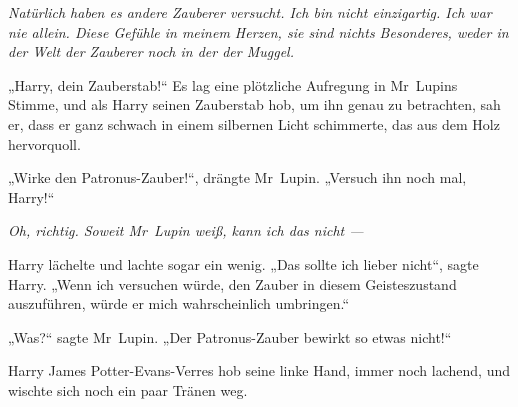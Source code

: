 \emph{Natürlich haben es andere Zauberer versucht. Ich bin nicht einzigartig. Ich war nie allein. Diese Gefühle in meinem Herzen, sie sind nichts Besonderes, weder in der Welt der Zauberer noch in der der Muggel.}

„Harry, dein Zauberstab!“ Es lag eine plötzliche Aufregung in Mr~Lupins Stimme, und als Harry seinen Zauberstab hob, um ihn genau zu betrachten, sah er, dass er ganz schwach in einem silbernen Licht schimmerte, das aus dem Holz hervorquoll.

„Wirke den Patronus-Zauber!“, drängte Mr~Lupin.
„Versuch ihn noch mal, Harry!“

\emph{Oh, richtig. Soweit Mr~Lupin weiß, kann ich das nicht —}

Harry lächelte und lachte sogar ein wenig.
„Das sollte ich lieber nicht“, sagte Harry.
„Wenn ich versuchen würde, den Zauber in diesem Geisteszustand auszuführen, würde er mich wahrscheinlich umbringen.“

„Was?“ sagte Mr~Lupin.
„Der Patronus-Zauber bewirkt so etwas nicht!“

Harry James Potter-Evans-Verres hob seine linke Hand, immer noch lachend, und wischte sich noch ein paar Tränen weg.

